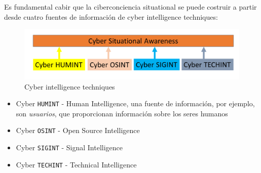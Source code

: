 Es fundamental cabir que la ciberconciencia situational se puede costruir a partir desde cuatro fuentes de información de cyber intelligence techniques:
\begin{figure}[htbp]
   \centering
   \includegraphics{images/01/CS_CI.png}
   \caption{Cyber intelligence techniques}
   \label{fig:01/CS_CI}
\end{figure}

\begin{itemize}
   \item Cyber \texttt{HUMINT} - Human Intelligence, una fuente de información, por ejemplo, son \textit{usuarios}, que proporcionan información sobre los seres humanos
   \item Cyber \texttt{OSINT} - Open Source Intelligence
   \item Cyber \texttt{SIGINT} - Signal Intelligence
   \item Cyber \texttt{TECHINT} - Technical Intelligence 
\end{itemize}

